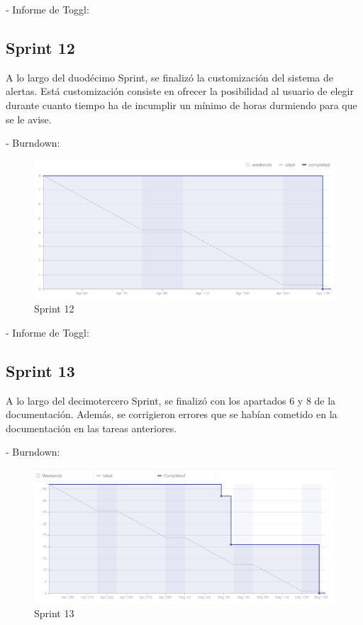 \documentclass[11pt,openany]{book}
\begin{document}
- Informe de Toggl:



\subsection{Sprint 12}

A lo largo del duodécimo Sprint, se finalizó la customización del sistema de alertas. Está customización consiste en ofrecer la posibilidad al usuario de elegir durante cuanto tiempo ha de incumplir un mínimo de horas durmiendo para que se le avise.

- Burndown:

\begin{figure}[H]
\centering
\includegraphics[totalheight=7cm]{burndowns/Sprint12.png}
\caption{Sprint 12}
\end{figure}

- Informe de Toggl:



\subsection{Sprint 13}

A lo largo del decimotercero Sprint, se finalizó con los apartados 6 y 8 de la documentación. Además, se corrigieron errores que se habían cometido en la documentación en las tareas anteriores.

- Burndown:

\begin{figure}[H]
\centering
\includegraphics[totalheight=7cm]{burndowns/Sprint13.png}
\caption{Sprint 13}
\end{figure}
\end{document}
